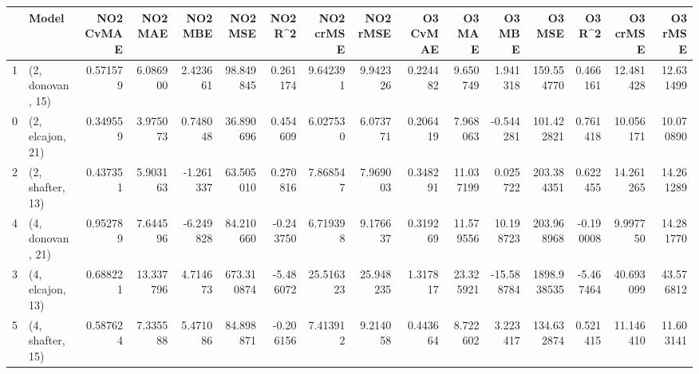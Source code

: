 \begin{tabular}{llrrrrrrrrrrrrrr}
\toprule
{} &             Model &  NO2 CvMAE &    NO2 MAE &   NO2 MBE &     NO2 MSE &   NO2 R\textasciicircum2 &  NO2 crMSE &   NO2 rMSE &  O3 CvMAE &     O3 MAE &     O3 MBE &       O3 MSE &    O3 R\textasciicircum2 &   O3 crMSE &    O3 rMSE \\
\midrule
1 &  (2, donovan, 15) &   0.571579 &   6.086900 &  2.423661 &   98.849845 &  0.261174 &   9.642391 &   9.942326 &  0.224482 &   9.650749 &   1.941318 &   159.554770 &  0.466161 &  12.481428 &  12.631499 \\
0 &  (2, elcajon, 21) &   0.349559 &   3.975073 &  0.748048 &   36.890696 &  0.454609 &   6.027530 &   6.073771 &  0.206419 &   7.968063 &  -0.544281 &   101.422821 &  0.761418 &  10.056171 &  10.070890 \\
2 &  (2, shafter, 13) &   0.437351 &   5.903163 & -1.261337 &   63.505010 &  0.270816 &   7.868547 &   7.969003 &  0.348291 &  11.037199 &   0.025722 &   203.384351 &  0.622455 &  14.261265 &  14.261289 \\
4 &  (4, donovan, 21) &   0.952789 &   7.644596 & -6.249828 &   84.210660 & -0.243750 &   6.719398 &   9.176637 &  0.319269 &  11.579556 &  10.198723 &   203.968968 & -0.190008 &   9.997750 &  14.281770 \\
3 &  (4, elcajon, 13) &   0.688221 &  13.337796 &  4.714673 &  673.310874 & -5.486072 &  25.516323 &  25.948235 &  1.317817 &  23.325921 & -15.588784 &  1898.938535 & -5.467464 &  40.693099 &  43.576812 \\
5 &  (4, shafter, 15) &   0.587624 &   7.335588 &  5.471086 &   84.898871 & -0.206156 &   7.413912 &   9.214058 &  0.443664 &   8.722602 &   3.223417 &   134.632874 &  0.521415 &  11.146410 &  11.603141 \\
\bottomrule
\end{tabular}
